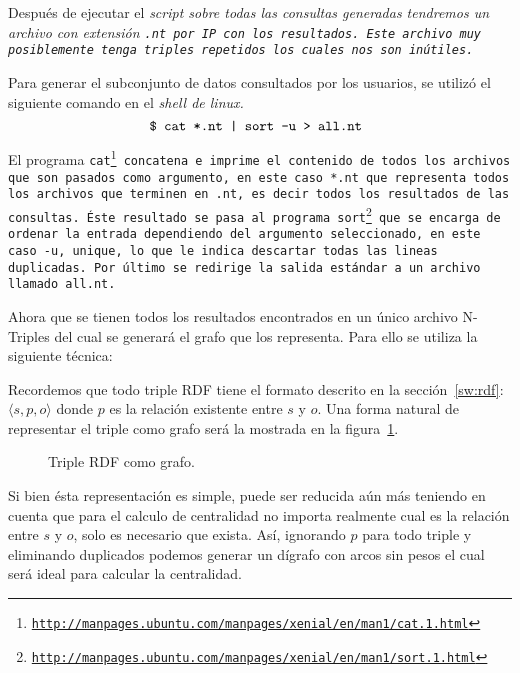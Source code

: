 Después de ejecutar el \it{script} sobre todas las consultas generadas tendremos
un archivo con extensión \tt{.nt} por IP con los resultados.
Este archivo muy posiblemente tenga triples repetidos los cuales nos son
inútiles.

Para generar el subconjunto de datos consultados por los usuarios, se utilizó el
siguiente comando en el \it{shell} de \it{linux}.
$$\tt{\$ cat *.nt | sort -u > all.nt }$$

El programa \tt{cat}\footnote{
  \url{http://manpages.ubuntu.com/manpages/xenial/en/man1/cat.1.html}} 
concatena e imprime el contenido de todos los archivos que
son pasados como argumento, en este caso \tt{*.nt} que representa todos los
archivos que terminen en \tt{.nt}, es decir todos los resultados de las
consultas.
Éste resultado se pasa al programa \tt{sort}\footnote{
  \url{http://manpages.ubuntu.com/manpages/xenial/en/man1/sort.1.html}}
que se encarga de ordenar la entrada dependiendo del argumento seleccionado, en
este caso \tt{-u}, \tt{unique}, lo que le indica descartar todas las lineas
duplicadas. Por último se redirige la salida estándar a un archivo llamado
\tt{all.nt}.

Ahora que se tienen todos los resultados encontrados en un único archivo
N-Triples del cual se generará el grafo que los representa.
Para ello se utiliza la siguiente técnica:

Recordemos que todo triple RDF tiene el formato descrito en la
sección~\ref{sw:rdf}: $\langle s,p,o\rangle$
donde $p$ es la relación existente entre $s$ y $o$. Una forma natural de
representar el triple como grafo será la mostrada en la
figura~\ref{fig:rdfgraphsimple}.

\begin{figure}[htpb]
  \centering
  \caption{Triple RDF como grafo.}
  \label{fig:rdfgraphsimple}
\end{figure}

Si bien ésta representación es simple, puede ser reducida aún más teniendo en
cuenta que para el calculo de centralidad no importa realmente cual es la
relación entre $s$ y $o$, solo es necesario que exista. Así, ignorando $p$ para
todo triple y eliminando duplicados podemos generar un dígrafo con arcos sin
pesos el cual será ideal para calcular la centralidad.

